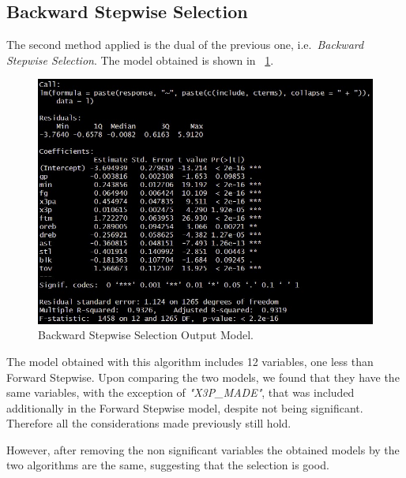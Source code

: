 \subsection{Backward Stepwise Selection}

The second method applied is the dual of the previous one, i.e.\ \textit{Backward Stepwise Selection}. The model obtained is shown in \Fig~\ref{fig:BackwardModelSummary}.
\begin{figure}[h]
	\centering
	\includegraphics[width=0.35\linewidth]{ImageFiles/Regression/Backward/BackwardModelSummary}
	\caption{Backward Stepwise Selection Output Model.}
	\label{fig:BackwardModelSummary}
\end{figure}

The model obtained with this algorithm includes 12 variables, one less than Forward Stepwise. Upon comparing the two models, we found that they have the same variables, with the exception of \textit{"X3P\_MADE"}, that was included additionally in the Forward Stepwise model, despite not being significant.
Therefore all the considerations made previously still hold.

However, after removing the non significant variables the obtained models by the two algorithms are the same, suggesting that the selection is good.